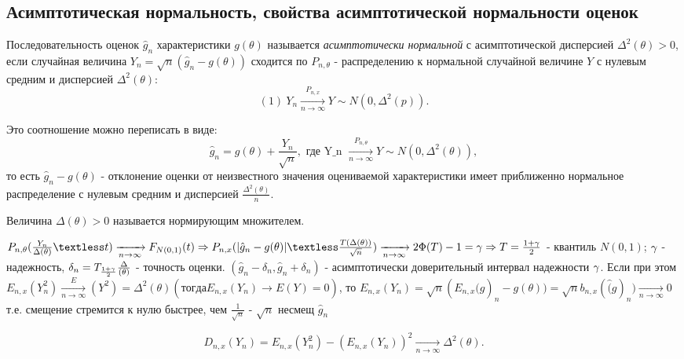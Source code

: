\subsection{Асимптотическая нормальность, свойства асимптотической нормальности оценок}
\begin{definition}
	Последовательность оценок $\hat{g}_n$ характеристики $g(\theta)$ называется \textit{асимптотически нормальной} с асимптотической дисперсией $\Delta^2(\theta) > 0$, если случайная величина $Y_n = \sqrt{n}(\hat{g}_n - g(\theta))$ сходится по $P_{n, \theta}$ - распределению к нормальной случайной величине $Y$ с нулевым средним и дисперсией $\Delta^2(\theta)$:
  \[
    (1)~ Y_n \xrightarrow[n \to \infty]{P_{n, x}} Y \sim N(0, \Delta^2(p))
  .\]
\end{definition}

Это соотношение можно переписать в виде:
\[
  \hat{g}_n = g(\theta) + \frac{Y_n}{\sqrt{n}}, \text{ где Y_n } \xrightarrow[n \to \infty]{P_{n, \theta}} Y \sim N(0, \Delta^2(\theta))
,\]
то есть $\hat{g}_n - g(\theta)$ - отклонение оценки от неизвестного значения оцениваемой характеристики имеет приближенно нормальное распределение с нулевым средним и дисперсией $\frac{\Delta^2(\theta)}{n}$.

\begin{definition}
  Величина $\Delta(\theta) > 0$ называется нормирующим множителем.
\end{definition}

$P_{n, \theta}(\frac{Y_n}{\Delta(\theta)} \textless t) \xrightarrow[n \to \infty]{} F_{N(0, 1)}(t) \Rightarrow{} P_{n, x}(|\hat{g}_n - g(\theta)| \textless \frac{T(\Delta(\theta))} {\sqrt{n}}) \xrightarrow[n \to \infty]{} 2\Phi(T) - 1 = \g \Rightarrow{} T = \frac{1 + \g}{2}$ - квантиль $N(0, 1)$;
$\gamma$ - надежность, $\delta_n = T_{\frac{1 + \gamma}{2}}\frac{\Delta}{(\theta)}$ - точность оценки.
$(\hat{g}_n - \delta_n, \hat{g}_n + \delta_n)$ - асимптотически доверительный интервал надежности $\gamma$.
Если при этом $E_{n, x}(Y_n^2) \xrightarrow[n \to \infty] E(Y^2) = \Delta^2(\theta) (тогда E_{n, x}(Y_n) \xrightarrow[]{} E(Y) = 0)$, то $E_{n, x}(Y_n) = \sqrt{n}(E_{n, x}\hat(g)_n - g(\theta))
 = \sqrt{n}b_{n, x}(\hat(g)_n) \xrightarrow[n \to \infty]{} 0$
 т.е. смещение стремится к нулю быстрее, чем $\frac{1}{\sqrt{n}}$
- $\sqrt{n}$ несмещ $\hat{g}_n$

\[
  D_{n, x}(Y_n) = E_{n, x}(Y_n^2) - (E_{n, x}(Y_n))^2 \xrightarrow[n \to \infty]{} \Delta^2(\theta)
.\]

